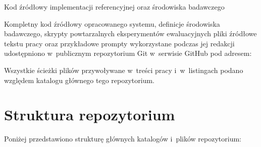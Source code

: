 \begin{easyappendix}{Kod źródłowy implementacji referencyjnej oraz środowiska badawczego}
\label{app:kod_zrodlowy}

Kompletny kod źródłowy opracowanego systemu, definicje środowiska badawczego, skrypty powtarzalnych eksperymentów ewaluacyjnych pliki źródłowe tekstu pracy oraz przykładowe prompty wykorzystane podczas jej redakcji udostępniono w~publicznym repozytorium Git w~serwisie GitHub pod adresem:
\begin{center}
\repoUrl
\end{center}
Wszystkie ścieżki plików przywoływane w~treści pracy i~w~listingach podano względem katalogu głównego tego repozytorium.

\section*{Struktura repozytorium}

Poniżej przedstawiono strukturę głównych katalogów i~plików repozytorium:


\end{easyappendix}
